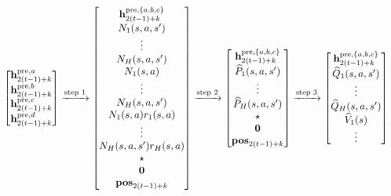 \begin{align}
    \begin{bmatrix}
    {\mathbf h}_{2(t-1)+k}^{{\mathrm{pre}},{a}} \\  {\mathbf h}_{2(t-1)+k}^{{\mathrm{pre}},{b}}\\  {\mathbf h}_{2(t-1)+k}^{{\mathrm{pre}},{c}}\\   {\mathbf h}_{2(t-1)+k}^{{\mathrm{pre}},{d}}
\end{bmatrix}&
\xrightarrow{\text{step 1}}
   \begin{bmatrix}
    {\mathbf h}_{2(t-1)+k}^{{\mathrm{pre}},\{{a},{b},{c}\}} \\
        {N}_{1}({s},{a},{s}') \\ \vdots \\
         {N}_{{H}}({s},{a},{s}')
         \\
        {N}_{1}({s},{a}) \\\vdots\\
        {N}_{{H}}({s},{a},{s}')
         \\
         {N}_{1}({s},{a}){r}_{1}({s},{a}) \\\vdots\\
        {N}_{{H}}({s},{a},{s}') {r}_{{H}}({s},{a})
         \\
         \star\\ {\mathbf 0} \\{\mathbf{pos}}_{2(t-1)+k}
\end{bmatrix}
\xrightarrow{\text{step 2}}
\begin{bmatrix}
    {\mathbf h}_{2(t-1)+k}^{{\mathrm{pre}},\{{a},{b},{c}\}} \\
         \widehat{P}_{1}({s},{a},{s}') \\ \vdots \\
         \widehat{P}_{{H}}({s},{a},{s}')  \\ \star
        \\ {\mathbf 0} \\{\mathbf{pos}}_{2(t-1)+k}
\end{bmatrix}
\xrightarrow{\text{step 3}}
\begin{bmatrix}
    {\mathbf h}_{2(t-1)+k}^{{\mathrm{pre}},\{{a},{b},{c}\}} \\
         {\widehat{{Q}}}_{1}({s},{a},{s}') \\ \vdots \\
         {\widehat{{Q}}}_{{H}}({s},{a},{s}')  \\
           {\widehat{{{V}}}}_{1}({s}) \\ \vdots \\

\end{bmatrix}
\end{align}
